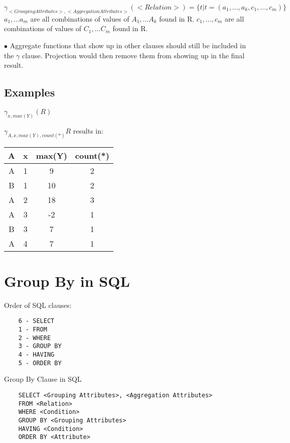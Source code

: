 \documentclass[twoside]{article}
\begin{document}
$\gamma_{<Grouping Attributes>, <Aggregation Attributes>}(<Relation>) = \{ t |
t = (a_1,..., a_k, c_1,...,c_m)\}$ $a_1,...a_m$ are all combinations of values 
of $A_1,\dots A_k$ found in R. $c_1,...,c_m$ are all combinations of values of 
$C_1,\dots C_m$ found in R.

$\bullet$ Aggregate functions that show up in other clauses should still be 
included in the $\gamma$ clause. Projection would then remove them from showing 
up in the final result.

\subsection*{Examples}
$\gamma_{x, max(Y)}(R)$

$\gamma_{A, x, max(Y), count(*)}{R}$ results in:

\begin{table}[!htb]
    \centering
    \begin{tabular}{|c|c|c|c|}
        \hline
        A & x & max(Y) & count(*) \\
        \hline
        A & 1 & 9 & 2 \\
        \hline
        B & 1 & 10 & 2 \\
        \hline
        A & 2 & 18 & 3 \\
        \hline
        A & 3 & -2 & 1 \\
        \hline
        B & 3 & 7 & 1 \\
        \hline
        A & 4 & 7 & 1 \\
        \hline
    \end{tabular}
\end{table}

\section*{Group By in SQL}

Order of SQL clauses:
\begin{verbatim}
    6 - SELECT
    1 - FROM
    2 - WHERE
    3 - GROUP BY
    4 - HAVING
    5 - ORDER BY
\end{verbatim}

Group By Clause in SQL
\begin{verbatim}
    SELECT <Grouping Attributes>, <Aggregation Attributes>
    FROM <Relation>
    WHERE <Condition>
    GROUP BY <Grouping Attributes>
    HAVING <Condition>
    ORDER BY <Attribute>
\end{verbatim}
\end{document}
